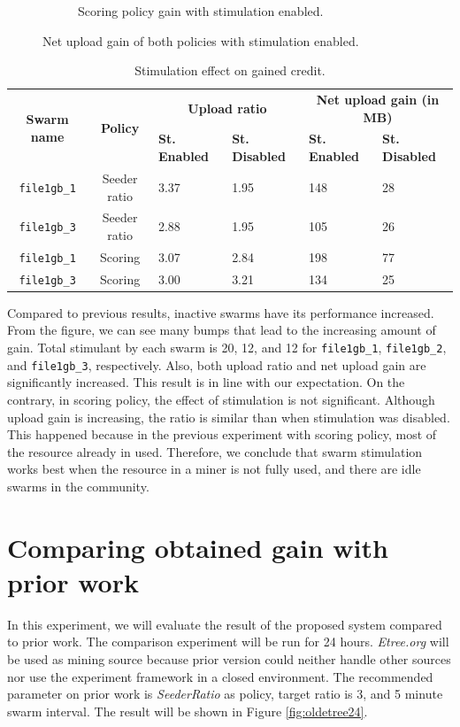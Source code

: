 \begin{figure}[b!]
\begin{adjustwidth}{-1.5cm}{}
\begin{subfigure}[t]{0.6\textwidth}
			\caption{Scoring policy gain with stimulation enabled.}
			\label{fig:simplescsrtrig}
		\end{subfigure}
		\caption{Net upload gain of both policies with stimulation enabled.}
	\end{adjustwidth}
\end{figure}

\begin{table}[h]
	\centering
	\caption{Stimulation effect on gained credit.}
	\label{tbl:stimul}
	\begin{tabular}{|c|c|l|l|l|l|}
		\hline
		\multirow{2}{*}{\textbf{Swarm name}} & \multirow{2}{*}{\textbf{Policy}} & \multicolumn{2}{c|}{\textbf{Upload ratio}} & \multicolumn{2}{c|}{\textbf{Net upload gain (in MB)}} \\ \cline{3-6} 
		&  & \textbf{St. Enabled} & \textbf{St. Disabled} & \textbf{St. Enabled} & \textbf{St. Disabled} \\ \hline
		\texttt{file1gb\_1} & Seeder ratio & 3.37 & 1.95 & 148 & 28 \\ \hline
		\texttt{file1gb\_3} & Seeder ratio & 2.88 & 1.95 & 105 & 26 \\ \hline
		\texttt{file1gb\_1} & Scoring & 3.07 & 2.84 & 198 & 77 \\ \hline
		\texttt{file1gb\_3} & Scoring & 3.00 & 3.21 & 134 & 25 \\ \hline
	\end{tabular}
\end{table}

Compared to previous results, inactive swarms have  its performance increased. From the figure, we can see many bumps that lead to the increasing amount of gain. Total stimulant by each swarm is 20, 12, and 12 for \texttt{file1gb\_1}, \texttt{file1gb\_2}, and \texttt{file1gb\_3}, respectively. Also, both upload ratio and net upload gain are significantly increased. This result is in line with our expectation. On the contrary, in scoring policy, the effect of stimulation is not significant. Although upload gain is increasing, the ratio is similar than when stimulation was disabled. This happened because in the previous experiment with scoring policy, most of the resource already in used. Therefore, we conclude that swarm stimulation works best when the resource in a miner is not fully used, and there are idle swarms in the community.

\section{Comparing obtained gain with prior work}
In this experiment, we will evaluate the result of the proposed system compared to prior work. The comparison experiment will be run for 24 hours. \textit{Etree.org} will be used as mining source because prior version could neither handle other sources nor use the experiment framework in a closed environment. The recommended parameter on prior work is \textit{SeederRatio} as policy, target ratio is 3, and 5 minute swarm interval. The result will be shown in Figure \ref{fig:oldetree24}.

